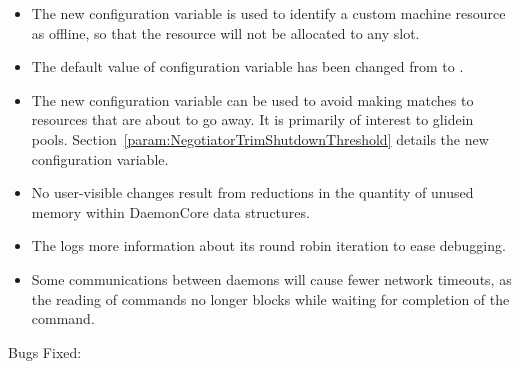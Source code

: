 \begin{itemize}
\item The new configuration variable 
is used to identify a custom machine resource as offline,
so that the resource will not be allocated to any slot.

\item The default value of configuration variable 
 has been changed from 
 to .

\item The new configuration variable 
 can be used to avoid 
making matches to resources that are about to go away. 
It is primarily of interest to glidein pools.  
Section~\ref{param:NegotiatorTrimShutdownThreshold} details the new
configuration variable.

\item No user-visible changes result from reductions in the quantity of
unused memory within DaemonCore data structures.

\item The  logs more information about its round robin
iteration to ease debugging.

\item Some communications between daemons will cause fewer network timeouts,
as the reading of commands no longer blocks while
waiting for completion of the command.

\end{itemize}

\noindent Bugs Fixed:

